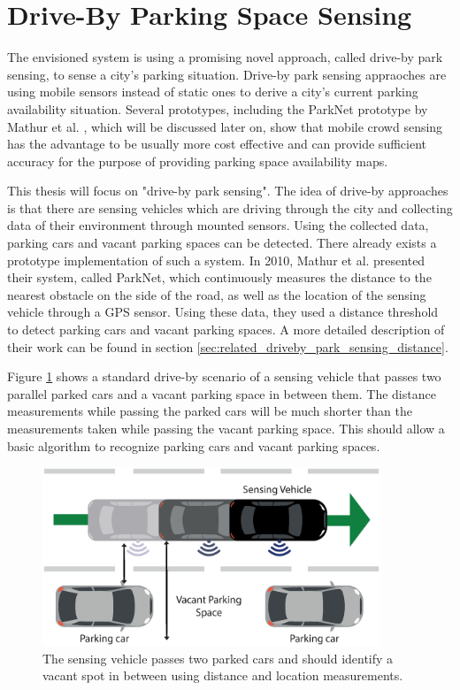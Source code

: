 \section{Drive-By Parking Space Sensing}

The envisioned system is using a promising novel approach, called drive-by park sensing, to sense a city's parking situation. Drive-by park sensing appraoches are using mobile sensors instead of static ones to derive a city's current parking availability situation. Several prototypes, including the ParkNet prototype by Mathur et al. \cite{Mathur:2010:PDS:1814433.1814448}, which will be discussed later on, show that mobile crowd sensing has the advantage to be usually more cost effective and can provide sufficient accuracy for the purpose of providing parking space availability maps. 

This thesis will focus on "drive-by park sensing". The idea of drive-by approaches is that there are sensing vehicles which are driving through the city and collecting data of their environment through mounted sensors. Using the collected data, parking cars and vacant parking spaces can be detected. There already exists a prototype implementation of such a system. In 2010, Mathur et al. \cite{Mathur:2010:PDS:1814433.1814448} presented their system, called ParkNet, which continuously measures the distance to the nearest obstacle on the side of the road, as well as the location of the sensing vehicle through a GPS sensor. Using these data, they used a distance threshold to detect parking cars and vacant parking spaces. A more detailed description of their work can be found in section \ref{sec:related_driveby_park_sensing_distance}.

Figure \ref{fig:driveby_standard_parking_situation} shows a standard drive-by scenario of a sensing vehicle that passes two parallel parked cars and a vacant parking space in between them. The distance measurements while passing the parked cars will be much shorter than the measurements taken while passing the vacant parking space. This should allow a basic algorithm to recognize parking cars and vacant parking spaces.

\begin{figure}
	\centering
	\includegraphics[width=0.9\textwidth]{img/drive-by-parking-situation-pictogram.eps}
	\caption{The sensing vehicle passes two parked cars and should identify a vacant spot in between using distance and location measurements.}
	\label{fig:driveby_standard_parking_situation}
\end{figure}

